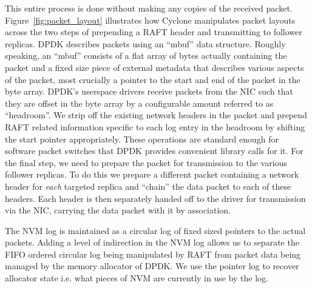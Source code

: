 \documentclass[letterpaper,twocolumn,10pt]{article}
\begin{document}
This entire process is done without making any copies of the received
packet.  Figure~\ref{fig:packet_layout} illustrates how Cyclone
manipulates packet layouts across the two steps of prepending a RAFT
header and transmitting to follower replicas. DPDK describes packets
using an ``mbuf'' data structure. Roughly speaking, an ``mbuf''
consists of a flat array of bytes actually containing the packet and a
fixed size piece of external metadata that describes various aspects
of the packet, most crucially a pointer to the start and end of the
packet in the byte array. DPDK's userspace drivers receive packets
from the NIC such that they are offset in the byte array by a
configurable amount referred to as ``headroom''. We strip off the
existing network headers in the packet and prepend RAFT related
information specific to each log entry in the headroom by shifting the
start pointer appropriately.  These operations are standard enough for
software packet switches that DPDK provides convenient library calls
for it. For the final step, we need to prepare the packet for
transmission to the various follower replicas. To do this we prepare a
different packet containing a network header for \emph{each} targeted
replica and ``chain'' the data packet to each of these headers. Each
header is then separately handed off to the driver for transmission
via the NIC, carrying the data packet with it by association.

The NVM log is maintained as a circular log of fixed sized pointers to
the actual packets. Adding a level of indirection in the NVM log
allows us to separate the FIFO ordered circular log being manipulated
by RAFT from packet data being managed by the memory allocator of
DPDK. We use the pointer log to recover allocator state i.e. what
pieces of NVM are currently in use by the log.

\end{document}
